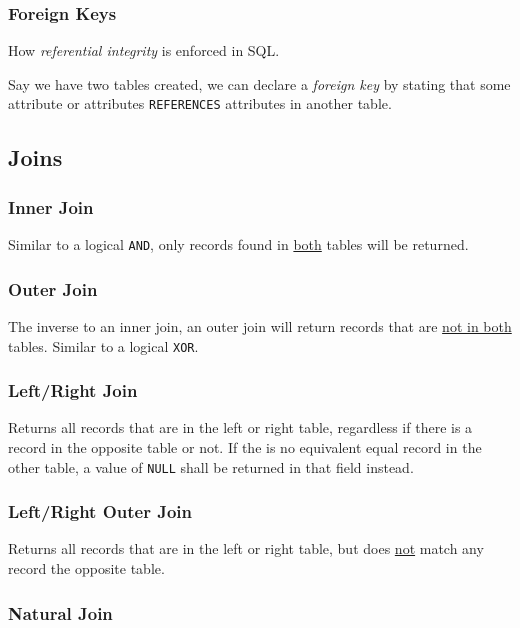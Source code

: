 \documentclass{article}
\begin{document}
\subsubsection{Foreign Keys}

How \textit{referential integrity} is enforced in SQL.

Say we have two tables created, we can declare a \textit{foreign key} by stating that some attribute or attributes \texttt{REFERENCES} attributes in another table.

\subsection{Joins}

\subsubsection{Inner Join}

Similar to a logical \texttt{AND}, only records found in \underline{both} tables will be returned.

\subsubsection{Outer Join}

The inverse to an inner join, an outer join will return records that are \underline{not in both} tables. Similar to a logical \texttt{XOR}.

\subsubsection{Left/Right Join}

Returns all records that are in the left or right table, regardless if there is a record in the opposite table or not. If the is no equivalent equal record in the other table, a value of \texttt{NULL} shall be returned in that field instead.

\subsubsection{Left/Right Outer Join}

Returns all records that are in the left or right table, but does \underline{not} match any record the opposite table.

\subsubsection{Natural Join}
\end{document}
